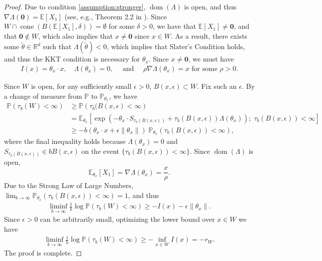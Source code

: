 \documentclass[aap,preprint]{imsart}
\newcommand{\Pro}{{\mathbb{P}}}
\newcommand{\Exp}{{\mathbb{E}}}
\newcommand{\bR}{{\mathbb{R}}}
\theoremstyle{plain}
\theoremstyle{definition}
\begin{document}
\begin{appendix}
\begin{proof}
Due to condition \eqref{assumption:stronger}, $\operatorname{dom}(\Lambda)$ is open, and thus $\nabla \Lambda(\mathbf{0}) = \Exp[X_1]$ (see, e.g., Theorem 2.2 in \cite{brown1986fundamentals}). Since $W \cap \operatorname{cone}(B(\Exp[X_1], \delta)) = \emptyset$ for some $\delta > 0$, we have that $\Exp[X_1] \neq \mathbf{0}$, and that $\mathbf{0} \not \in W$, which also implies that $x \neq \mathbf{0}$ since $x \in W$. As a result, there exists some $\tilde{\theta} \in \bR^{d}$ such that $\Lambda(\tilde{\theta}) < 0$, which  implies that Slater’s Condition \cite[Asumption 6.4.3]{bertsekas2003convex} holds, and thus the KKT condition is necessary for $\theta_x$. Since $x \neq \mathbf{0}$, we must have
\begin{align} \label{aux:for_remark}
    I(x) = \theta_x \cdot x, \quad \Lambda(\theta_x) = 0, \quad \text{ and } \quad \rho  \nabla  \Lambda(\theta_x) =  x  \text{ for some } \rho > 0.
\end{align}

Since $W$ is open, for any sufficiently small $\epsilon > 0$, $B(x,\epsilon) \subset W$.  Fix such an $\epsilon$.
By a change of measure from $\Pro$ to $\Pro_{\theta_x}$,  we have
\begin{align*}
 \Pro(\tau_b(W) < \infty)& \geq \Pro\left(\tau_b(B(x,\epsilon) < \infty \right) \\
 &= \Exp_{\theta_x}\left[\exp\left(- \theta_x \cdot S_{\tau_b(B(x,\epsilon))} + \tau_b(B(x,\epsilon)) \Lambda(\theta_x)\right);\; \tau_b(B(x,\epsilon))< \infty \right]  \\
& \geq   - b (\theta_x \cdot x + \epsilon \|\theta_x\|) \; \Pro_{\theta_x}\left(\tau_b(B(x,\epsilon)) < \infty \right),
\end{align*}
where the final inequality holds  because $\Lambda(\theta_x) = 0$ and  
$S_{\tau_b(B(x,\epsilon))} \in b B(x,\epsilon)$ on the event 
$\{\tau_b(B(x,\epsilon)) < \infty\}$.  Since $\operatorname{dom}(\Lambda)$ is open,
$$\Exp_{\theta_x}[X_1] = \nabla \Lambda(\theta_x) = \frac{x}{\rho}.
$$
Due to the Strong Law of Large Numbers, $\lim_{b \to \infty} \Pro_{\theta_x}\left(\tau_b(B(x,\epsilon)) < \infty \right) = 1$, and thus
\begin{align*}
      \liminf_{b \to \infty} \frac{1}{b} \log \Pro(\tau_b(W) < \infty) \geq 
       - I(x) - \epsilon \|\theta_x\|.
\end{align*}
Since $\epsilon >0$ can be arbitrarily small,  optimizing the lower bound over $x \in W$ we have
\begin{align*}
     \liminf_{b \to \infty} \frac{1}{b} \log \Pro(\tau_b(W) < \infty) \geq 
       - \inf_{x \in W} I(x)  = - r_W.
\end{align*}
The proof is complete.
\end{proof}


\end{appendix}
\end{document}
